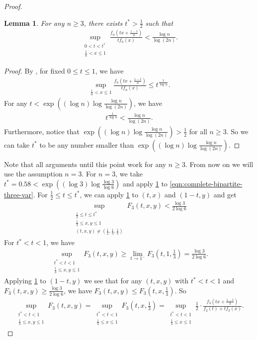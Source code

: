 \documentclass[11pt]{article}
\newtheorem{lemma}[theorem]{Lemma}
\theoremstyle{definition}
\begin{document}
\begin{proof}
  \begin{lemma} \label{lem:complete-bipartite-1}
    For any $n\ge 3$, there exists $t^*>\frac 12$ such that
    \begin{align}
      \sup_{\substack{0< t < t^* \\ \frac 1n < x \le 1}} \frac {f_n\left( t x + \frac{1-t}n \right)}{t f_n(x)} < \frac{\log n}{\log (2n)}.
    \end{align}
  \end{lemma}
  \begin{proof}
    By \cite[Eqs.~(23) and (27)]{gu2023non}, for fixed $0\le t\le 1$, we have
    \begin{align}
      \sup_{\frac 1n < x \le 1} \frac {f_n\left( t x + \frac{1-t}n \right)}{t f_n(x)}
      \le t^{\frac 1{\log n}}.
    \end{align}
    For any $t < \exp\left((\log n) \log \frac{\log n}{\log(2n)} \right)$,
    we have
    \begin{align}
      t^{\frac 1{\log n}} < \frac{\log n}{\log(2n)}.
    \end{align}
    Furthermore, notice that $\exp\left((\log n) \log \frac{\log n}{\log(2n)} \right) > \frac 12$ for all $n\ge 3$.
    So we can take $t^*$ to be any number smaller than $\exp\left((\log n) \log \frac{\log n}{\log(2n)} \right)$.
  \end{proof}

  Note that all arguments until this point work for any $n\ge 3$. From now on we will use the assumption $n=3$.
  For $n=3$, we take $t^* = 0.58 < \exp\left((\log 3) \log \frac{\log 3}{\log 6} \right)$ and apply \cref{lem:complete-bipartite-1} to \cref{eqn:complete-bipartite-three-var}.
  For $\frac 12 \le t \le t^*$, we can apply \cref{lem:complete-bipartite-1} to $(t,x)$ and $(1-t,y)$ and get
  \begin{align} \label{eqn:complete-bipartite-three-var-i}
    \sup_{\substack{\frac 12 \le t\le t^*\\ \frac 13 \le x,y\le 1\\ (t,x,y) \ne \left(\frac 12, \frac 13, \frac 13\right)}} F_3(t,x,y) < \frac{\log 3}{2\log 6}
  \end{align}
  For $t^* < t < 1$, we have
  \begin{align}
    \sup_{\substack{t^* < t < 1\\ \frac 13 \le x,y\le 1}} F_3(t,x,y) \ge \lim_{t\to 1^-} F_3\left(t,1,\frac 13\right) = \frac{\log 3}{2\log 6}.
  \end{align}
  Applying \cref{lem:complete-bipartite-1} to $(1-t,y)$ we see that for any $(t,x,y)$ with $t^*<t<1$ and $F_3(t,x,y) \ge \frac{\log 3}{2\log 6}$, we have $F_3(t,x,y) \le F_3\left(t,x,\frac 13\right)$.
  So
  \begin{align} \label{eqn:complete-bipartite-three-var-ii}
    \sup_{\substack{t^* < t < 1\\ \frac 13 \le x,y\le 1}} F_3(t,x,y) =
    \sup_{\substack{t^* < t < 1\\ \frac 13 \le x\le 1}} F_3\left(t,x,\frac 13\right)
    =
    \sup_{\substack{t^* < t < 1\\ \frac 13 \le x\le 1}} \frac 12 \cdot \frac{f_3\left(t x+\frac{1-t}{3}\right)}{f_2(t) + t f_3(x)}.
  \end{align}


\end{proof}
\end{document}
